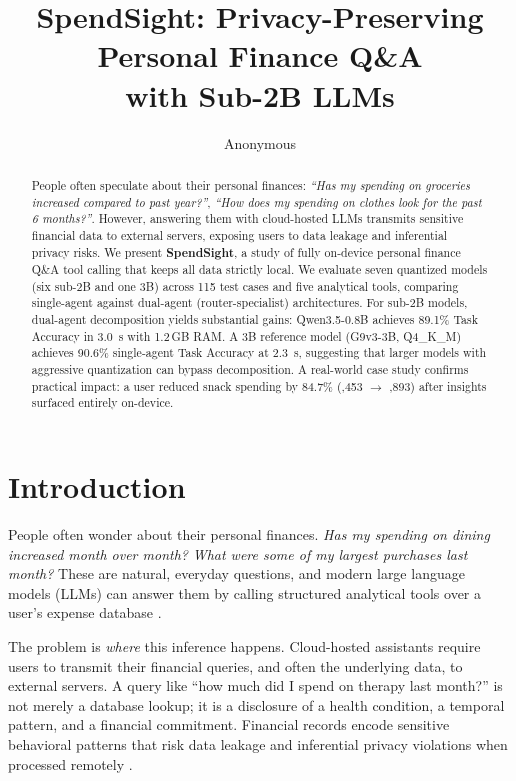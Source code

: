 \documentclass[11pt,twocolumn]{article}
\title{SpendSight: Privacy-Preserving Personal Finance Q\&A \\ with Sub-2B LLMs}
\author{Anonymous}
\begin{document}
\maketitle

\begin{abstract}
People often speculate about their personal
finances: \emph{``Has my spending on groceries increased compared to past year?''},
\emph{``How does my spending on clothes look for the past 6 months?''}. However, answering them
with cloud-hosted LLMs transmits sensitive financial data to external servers, exposing users to data leakage and inferential privacy risks.
We present \textbf{SpendSight}, a study of fully on-device
personal finance Q\&A tool calling that keeps all data strictly local.
We evaluate seven quantized models (six sub-2B and one 3B) across
115 test cases and five analytical tools, comparing single-agent
against dual-agent (router-specialist) architectures.
For sub-2B models, dual-agent decomposition yields substantial
gains: Qwen3.5-0.8B achieves 89.1\% Task Accuracy in 3.0~s with
1.2\,GB RAM.
A 3B reference model (G9v3-3B, Q4\_K\_M) achieves 90.6\%
single-agent Task Accuracy at 2.3~s, suggesting that larger
models with aggressive quantization can bypass decomposition.
A real-world case study confirms practical impact: a user
reduced snack spending by 84.7\%
(,453 $\to$ ,893) after insights surfaced
entirely on-device.
\end{abstract}

\section{Introduction}

People often wonder about their personal finances.
\emph{Has my spending on dining increased month over month?}
\emph{What were some of my largest purchases last month?}
These are natural, everyday questions, and modern large language
models (LLMs) can answer them by calling structured analytical
tools over a user's expense database
\citep{schick2024toolformer, patil2023gorilla, qin2023toolllm}.

The problem is \emph{where} this inference happens.
Cloud-hosted assistants require users to transmit their financial
queries, and often the underlying data, to external servers.
A query like ``how much did I spend on therapy last month?'' is
not merely a database lookup; it is a disclosure of a health
condition, a temporal pattern, and a financial commitment.
Financial records encode sensitive behavioral patterns that risk data leakage and inferential privacy violations when processed remotely \citep{staab2024memorization, yao2024survey}.
\end{document}
